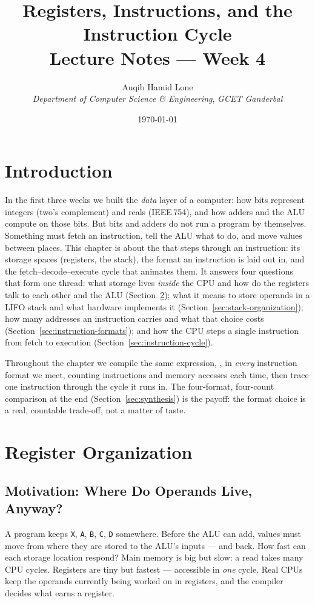 \documentclass[11pt]{article}
\title{Registers, Instructions, and the Instruction Cycle\\\large Lecture Notes --- Week 4}
\author{Auqib Hamid Lone\\[0.3em]
  \emph{Department of Computer Science \& Engineering}, \emph{GCET Ganderbal}}
\date{\today}
\begin{document}
\maketitle

\section{Introduction}

In the first three weeks we built the \emph{data} layer of a computer: how bits represent integers (two's complement) and reals (IEEE\,754), and how adders and the ALU compute on those bits. But bits and adders do not run a program by themselves. Something must fetch an instruction, tell the ALU what to do, and move values between places. This chapter is about the  that steps through an instruction: its storage spaces (registers, the stack), the format an instruction is laid out in, and the fetch--decode--execute cycle that animates them. It answers four questions that form one thread: what storage lives \emph{inside} the CPU and how do the registers talk to each other and the ALU (Section~\ref{sec:register-organization}); what it means to store operands in a LIFO stack and what hardware implements it (Section~\ref{sec:stack-organization}); how many addresses an instruction carries and what that choice costs (Section~\ref{sec:instruction-formats}); and how the CPU steps a single instruction from fetch to execution (Section~\ref{sec:instruction-cycle}).

Throughout the chapter we compile the same expression, , in \emph{every} instruction format we meet, counting instructions and memory accesses each time, then trace one instruction through the cycle it runs in. The four-format, four-count comparison at the end (Section~\ref{sec:synthesis}) is the payoff: the format choice is a real, countable trade-off, not a matter of taste.

\section{Register Organization}
\label{sec:register-organization}

\subsection{Motivation: Where Do Operands Live, Anyway?}

A program keeps \texttt{X}, \texttt{A}, \texttt{B}, \texttt{C}, \texttt{D} somewhere. Before the ALU can add, values must move from where they are stored to the ALU's inputs --- and back. How fast can each storage location respond? Main memory is big but slow: a read takes many CPU cycles. Registers are tiny but fastest --- accessible in \emph{one} cycle. Real CPUs keep the operands currently being worked on in registers, and the compiler decides what earns a register.
\end{document}
